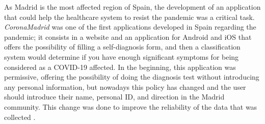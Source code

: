\documentclass[a4paper, 12pt]{article}
\begin{document}
As Madrid is the most affected region of Spain, the development of an application that could help the healthcare system to resist the pandemic was a critical task. \textit{CoronaMadrid} \cite{coronamadrid-page} was one of the first applications developed in Spain regarding the pandemic; it consists in a website and an application for Android and iOS that offers the possibility of filling a self-diagnosis form, and then a classification system would determine if you have enough significant symptoms for being considered as a COVID-19 affected. In the beginning, this application was permissive, offering the possibility of doing the diagnosis test without introducing any personal information, but nowadays this policy has changed and the user should introduce their name, personal ID, and direction in the Madrid community. This change was done to improve the reliability of the data that was collected \cite{coronamadrid-privacy}. \\
\end{document}
